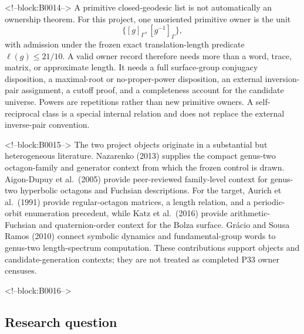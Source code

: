 \documentclass[11pt,a4paper]{article}
\begin{document}
<!--block:B0014-->
A primitive closed-geodesic list is not automatically an ownership theorem. For this project, one unoriented primitive owner is the unit \[
\{[g]_{\Gamma},[g^{-1}]_{\Gamma}\},
\] with admission under the frozen exact translation-length predicate \(\ell(g)\leq 21/10\). A valid owner record therefore needs more than a word, trace, matrix, or approximate length. It needs a full surface-group conjugacy disposition, a maximal-root or no-proper-power disposition, an external inversion-pair assignment, a cutoff proof, and a completeness account for the candidate universe. Powers are repetitions rather than new primitive owners. A self-reciprocal class is a special internal relation and does not replace the external inverse-pair convention.

<!--block:B0015-->
The two project objects originate in a substantial but heterogeneous literature. Nazarenko (2013)
\citep{P33-S01}
 supplies the compact genus-two octagon-family and generator context from which the frozen control is drawn. Aigon-Dupuy et al.~(2005)
\citep{P33-S02}
 provide peer-reviewed family-level context for genus-two hyperbolic octagons and Fuchsian descriptions. For the target, Aurich et al.~(1991)
\citep{P33-S05}
 provide regular-octagon matrices, a length relation, and a periodic-orbit enumeration precedent, while Katz et al.~(2016)
\citep{P33-S08}
 provide arithmetic-Fuchsian and quaternion-order context for the Bolza surface. Grácio and Sousa Ramos (2010)
\citep{P33-S09}
 connect symbolic dynamics and fundamental-group words to genus-two length-spectrum computation. These contributions support objects and candidate-generation contexts; they are not treated as completed P33 owner censuses.

<!--block:B0016-->
\hypertarget{research-question}{%
\subsection{Research question}\label{research-question}}
\end{document}
